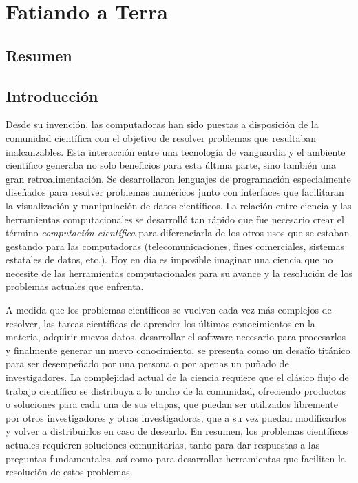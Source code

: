 \chapter{Fatiando a Terra}

\section{Resumen}


\section{Introducción}


Desde su invención, las computadoras han sido puestas a disposición de la
comunidad científica con el objetivo de resolver problemas que resultaban
inalcanzables.
Esta interacción entre una tecnología de vanguardia y el ambiente científico
generaba no solo beneficios para esta última parte, sino también una gran
retroalimentación.
Se desarrollaron lenguajes de programación especialmente diseñados para
resolver problemas numéricos junto con interfaces que facilitaran la
visualización y manipulación de datos científicos.
La relación entre ciencia y las herramientas computacionales se desarrolló tan
rápido que fue necesario crear el término \emph{computación científica} para
diferenciarla de los otros usos que se estaban gestando para las computadoras
(telecomunicaciones, fines comerciales, sistemas estatales de datos, etc.).
Hoy en día es imposible imaginar una ciencia que no necesite de las
herramientas computacionales para su avance y la resolución de los problemas
actuales que enfrenta.

A medida que los problemas científicos se vuelven cada vez más complejos de
resolver, las tareas científicas de aprender los últimos conocimientos en la
materia, adquirir nuevos datos, desarrollar el software necesario para
procesarlos y finalmente generar un nuevo conocimiento, se presenta como un
desafío titánico para ser desempeñado por una persona o por apenas un puñado de
investigadores.
La complejidad actual de la ciencia requiere que el clásico flujo de trabajo
científico se distribuya a lo ancho de la comunidad, ofreciendo productos
o soluciones para cada una de sus etapas, que puedan ser utilizados libremente
por otros investigadores y otras investigadoras, que a su vez puedan
modificarlos y volver a distribuirlos en caso de desearlo.
En resumen, los problemas científicos actuales requieren soluciones
comunitarias, tanto para dar respuestas a las preguntas fundamentales, así como
para desarrollar herramientas que faciliten la resolución de estos problemas.

